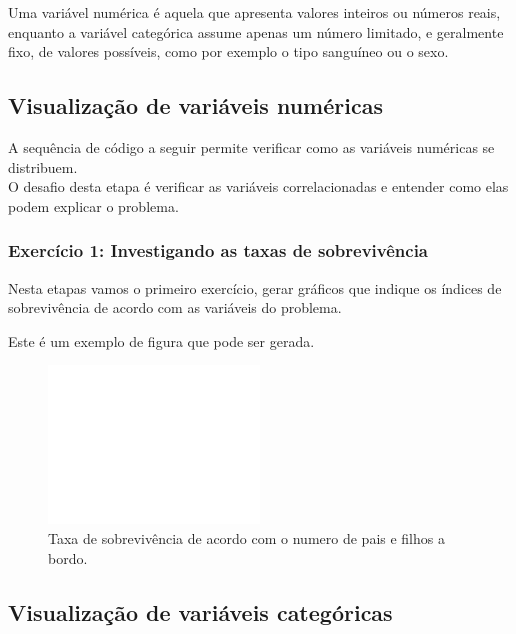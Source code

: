 \documentclass[a4paper,12pt]{report}
\begin{document}
Uma variável numérica é aquela que apresenta valores inteiros ou números reais, enquanto a variável categórica assume apenas um número limitado, e geralmente fixo, de valores possíveis, como por exemplo o tipo sanguíneo ou o sexo.

\subsection{Visualização de variáveis numéricas}

%

%

A sequência de código a seguir permite verificar como as variáveis numéricas se distribuem. \\



O desafio desta etapa é verificar as variáveis correlacionadas e entender como elas podem explicar o problema.

\subsubsection{Exercício 1: Investigando as taxas de sobrevivência}

Nesta etapas vamos o primeiro exercício, gerar gráficos que indique os índices de sobrevivência de acordo com as variáveis do problema.

Este é um exemplo de figura que pode ser gerada.

\begin{figure}[h]
	\centering
	\includegraphics[keepaspectratio, width=0.5\textwidth]{Parch_Survived_v0.pdf}
	\caption{Taxa de sobrevivência de acordo com o numero de pais e filhos a bordo.}
	\label{Fig:Exemplo_01}
\end{figure}

\subsection{Visualização de variáveis categóricas}
\end{document}
